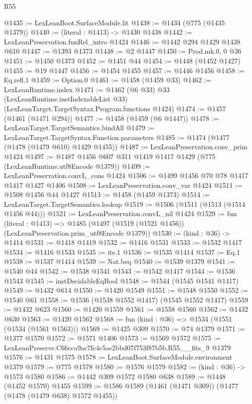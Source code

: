 \begin{lexlean}{R55}
\begin{coremodule}
{{@1435 := LexLeanBoot.SurfaceModule.lit
@1438 := @1434 (@775 (@1435 @1379))
@1440 := (literal : @1413) -> @1430 @1438
@1442 := LexLeanPreservation.funRel_intro @1424
@1446 := @1442 @294 @1429 @1438 @610
@1447 := @1393 @1373
@1448 := @2 @1447
@1450 := Prod.mk.{0, 0} @36
@1451 := @1450 @1373
@1452 := @1451 @44
@1454 := @1448 (@1452 @1427)
@1455 := @19 @1447
@1456 := @1454 @1455
@1457 := @1446 @1456
@1458 := Eq.refl.{1}
@1459 := Option.{0}
@1461 := @1458 (@1459 @33)
@1462 := LexLeanRuntime.index
@1471 := @1462
    (@6 @33)
    @33
    (LexLeanRuntime.instIndexableList @33)
    (LexLeanTarget.TargetSyntax.Program.functions @1424)
@1474 := @1457 (@1461 (@1471 @294))
@1477 := @1458 (@1459 (@6 @1447))
@1478 := LexLeanTarget.TargetSemantics.bindAll
@1479 := LexLeanTarget.TargetSyntax.Function.parameters
@1485 := @1474 (@1477 (@1478 (@1479 @610) @1429 @1455))
@1487 := LexLeanPreservation.conv_prim @1424
@1497 := @1487 @1456 @607 @311 @1419 @1417 @1429 (@775 (LexLeanRuntime.utf8Encode @1379))
@1499 := LexLeanPreservation.convL_cons @1424
@1506 := @1499 @1456 @70 @78 @1417 @1417 @1427 @1406
@1508 := LexLeanPreservation.conv_var @1424
@1511 := @1508 @1456 @44 @1427
@1513 := @1458 (@1459 @1373)
@1514 := LexLeanTarget.TargetSemantics.lookup
@1519 := @1506 (@1511 (@1513 (@1514 @1456 @44)))
@1521 := LexLeanPreservation.convL_nil @1424
@1529 := fun (literal : @1413) =>
  @1485 (@1497 (@1519 (@1521 @1456)) (LexLeanPreservation.prim_utf8Encode @1379))
@1530 := (kind : @36) -> @1414
@1531 := @1418 @1419
@1532 := @1416 @1531
@1533 := @1532 @1417
@1534 := @1416 @1533
@1535 := ite.{1}
@1536 := @1535 @1414
@1537 := Eq.{1}
@1538 := @1537 @1414
@1539 := Nat.beq
@1540 := @1539 @1379
@1541 := @1540 @44
@1542 := @1538 @1541
@1543 := @1542 @1417
@1544 := @1536 @1543
@1545 := instDecidableEqBool
@1548 := @1544 (@1545 @1541 @1417)
@1549 := @1432 @614
@1550 := @1420 @1549
@1551 := @1548 @1550
@1552 := @1540 @61
@1558 := @1536 (@1538 @1552 @1417) (@1545 @1552 @1417)
@1559 := @1432 @623
@1560 := @1420 @1559
@1561 := @1558 @1560
@1562 := @1432 @630
@1563 := @1420 @1562
@1568 := fun (kind : @36) => @1534 (@1551 (@1534 (@1561 @1563)))
@1569 := @1425 @309
@1570 := @74 @1379
@1571 := @1377 @1570
@1572 := @1571 @1406
@1573 := @1569 @1572
@1575 := LexLeanPreserve.C66cca9ac7fc4c5ae2bbd07f753f87b5b.R55.__fits_9 @1379
@1576 := @1431 @1575
@1578 := LexLeanBoot.SurfaceModule.environment @1379
@1579 := @775 @1578
@1580 := @1576 @1579
@1582 := (kind : @36) -> @1573 @1580
@1586 := @1442 @309 @1572 @1580 @638
@1589 := @1448 (@1452 @1570) @1455
@1599 := @1586 @1589 (@1461 (@1471 @309)) (@1477 (@1478 (@1479 @638) @1572 @1455))
}}
\end{coremodule}
\end{lexlean}
